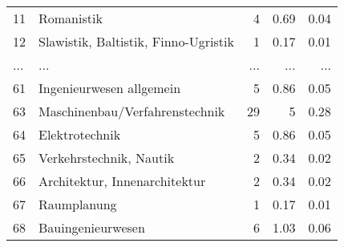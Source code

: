 \begin{longtable}{lXrrr}
        11 & \multicolumn{1}{X}{Romanistik} & %
          \num{4} &
          \num[round-mode=places,round-precision=2]{0,69} &
          \num[round-mode=places,round-precision=2]{0,04} \\
        12 & \multicolumn{1}{X}{Slawistik, Baltistik, Finno-Ugristik} & %
          \num{1} &
          \num[round-mode=places,round-precision=2]{0,17} &
          \num[round-mode=places,round-precision=2]{0,01} \\
       ... & ... & ... & ... & ... \\
        61 & \multicolumn{1}{X}{Ingenieurwesen allgemein} & %
          \num{5} &
          \num[round-mode=places,round-precision=2]{0,86} &
          \num[round-mode=places,round-precision=2]{0,05} \\

        63 & \multicolumn{1}{X}{Maschinenbau/Verfahrenstechnik} & %
          \num{29} &
          \num[round-mode=places,round-precision=2]{5} &
          \num[round-mode=places,round-precision=2]{0,28} \\

        64 & \multicolumn{1}{X}{Elektrotechnik} & %
          \num{5} &
          \num[round-mode=places,round-precision=2]{0,86} &
          \num[round-mode=places,round-precision=2]{0,05} \\

        65 & \multicolumn{1}{X}{Verkehrstechnik, Nautik} & %
          \num{2} &
          \num[round-mode=places,round-precision=2]{0,34} &
          \num[round-mode=places,round-precision=2]{0,02} \\

        66 & \multicolumn{1}{X}{Architektur, Innenarchitektur} & %
          \num{2} &
          \num[round-mode=places,round-precision=2]{0,34} &
          \num[round-mode=places,round-precision=2]{0,02} \\

        67 & \multicolumn{1}{X}{Raumplanung} & %
          \num{1} &
          \num[round-mode=places,round-precision=2]{0,17} &
          \num[round-mode=places,round-precision=2]{0,01} \\

        68 & \multicolumn{1}{X}{Bauingenieurwesen} & %
          \num{6} &
          \num[round-mode=places,round-precision=2]{1,03} &
          \num[round-mode=places,round-precision=2]{0,06} \\


\end{longtable}
